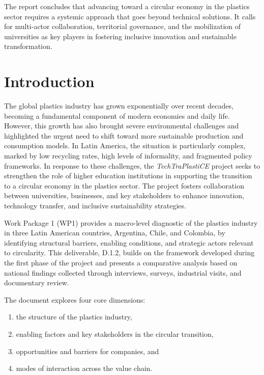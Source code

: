 \documentclass[
  12pt,
  oneside]{book}
\providecommand{\tightlist}{%
  \setlength{\itemsep}{0pt}\setlength{\parskip}{0pt}}
\begin{document}
The report concludes that advancing toward a circular economy in the
plastics sector requires a systemic approach that goes beyond technical
solutions. It calls for multi-actor collaboration, territorial
governance, and the mobilization of universities as key players in
fostering inclusive innovation and sustainable transformation.

\chapter{Introduction}\label{introduction}

The global plastics industry has grown exponentially over recent
decades, becoming a fundamental component of modern economies and daily
life. However, this growth has also brought severe environmental
challenges and highlighted the urgent need to shift toward more
sustainable production and consumption models. In Latin America, the
situation is particularly complex, marked by low recycling rates, high
levels of informality, and fragmented policy frameworks. In response to
these challenges, the \emph{TechTraPlastiCE} project seeks to strengthen
the role of higher education institutions in supporting the transition
to a circular economy in the plastics sector. The project fosters
collaboration between universities, businesses, and key stakeholders to
enhance innovation, technology transfer, and inclusive sustainability
strategies.

Work Package 1 (WP1) provides a macro-level diagnostic of the plastics
industry in three Latin American countries, Argentina, Chile, and
Colombia, by identifying structural barriers, enabling conditions, and
strategic actors relevant to circularity. This deliverable, D.1.2,
builds on the framework developed during the first phase of the project
and presents a comparative analysis based on national findings collected
through interviews, surveys, industrial visits, and documentary review.

The document explores four core dimensions:

\begin{enumerate}
\def\labelenumi{\arabic{enumi}.}
\tightlist
\item
  the structure of the plastics industry,
\item
  enabling factors and key stakeholders in the circular transition,
\item
  opportunities and barriers for companies, and
\item
  modes of interaction across the value chain.
\end{enumerate}
\end{document}
